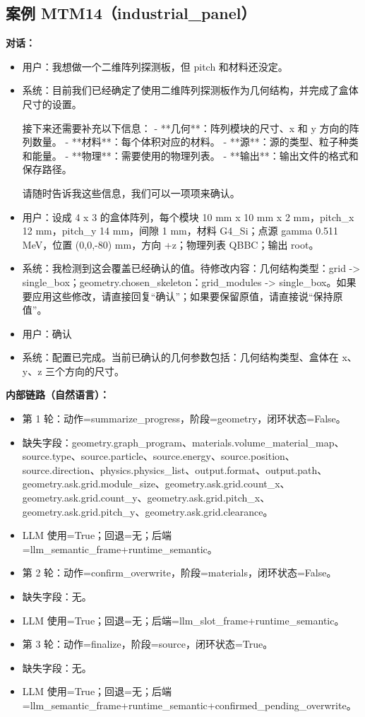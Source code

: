 \documentclass[11pt]{ctexart}
\begin{document}
\subsection{案例 MTM14（industrial\_panel）}
\textbf{对话：}
\begin{itemize}
\item 用户：我想做一个二维阵列探测板，但 pitch 和材料还没定。
\item 系统：目前我们已经确定了使用二维阵列探测板作为几何结构，并完成了盒体尺寸的设置。

接下来还需要补充以下信息：
- **几何**：阵列模块的尺寸、x 和 y 方向的阵列数量。
- **材料**：每个体积对应的材料。
- **源**：源的类型、粒子种类和能量。
- **物理**：需要使用的物理列表。
- **输出**：输出文件的格式和保存路径。

请随时告诉我这些信息，我们可以一项项来确认。
\item 用户：设成 4 x 3 的盒体阵列，每个模块 10 mm x 10 mm x 2 mm，pitch\_x 12 mm，pitch\_y 14 mm，间隙 1 mm，材料 G4\_Si；点源 gamma 0.511 MeV，位置 (0,0,-80) mm，方向 +z；物理列表 QBBC；输出 root。
\item 系统：我检测到这会覆盖已经确认的值。待修改内容：几何结构类型：grid -> single\_box；geometry.chosen\_skeleton：grid\_modules -> single\_box。如果要应用这些修改，请直接回复“确认”；如果要保留原值，请直接说“保持原值”。
\item 用户：确认
\item 系统：配置已完成。当前已确认的几何参数包括：几何结构类型、盒体在 x、y、z 三个方向的尺寸。
\end{itemize}
\textbf{内部链路（自然语言）：}
\begin{itemize}
\item 第 1 轮：动作=summarize\_progress，阶段=geometry，闭环状态=False。
\item 缺失字段：geometry.graph\_program、materials.volume\_material\_map、source.type、source.particle、source.energy、source.position、source.direction、physics.physics\_list、output.format、output.path、geometry.ask.grid.module\_size、geometry.ask.grid.count\_x、geometry.ask.grid.count\_y、geometry.ask.grid.pitch\_x、geometry.ask.grid.pitch\_y、geometry.ask.grid.clearance。
\item LLM 使用=True；回退=无；后端=llm\_semantic\_frame+runtime\_semantic。
\item 第 2 轮：动作=confirm\_overwrite，阶段=materials，闭环状态=False。
\item 缺失字段：无。
\item LLM 使用=True；回退=无；后端=llm\_slot\_frame+runtime\_semantic。
\item 第 3 轮：动作=finalize，阶段=source，闭环状态=True。
\item 缺失字段：无。
\item LLM 使用=True；回退=无；后端=llm\_semantic\_frame+runtime\_semantic+confirmed\_pending\_overwrite。
\end{itemize}
\end{document}
